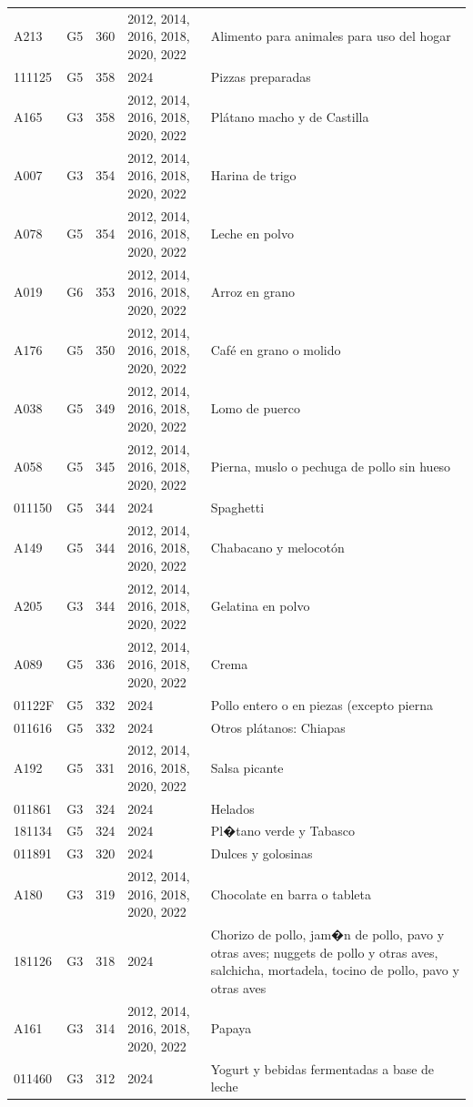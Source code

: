 \begin{table}[ht]
\begin{tabular}{llrll}
  A213 & G5 & 360 & 2012, 2014, 2016, 2018, 2020, 2022 & Alimento para animales para uso del hogar \\ 
  111125 & G5 & 358 & 2024 & Pizzas preparadas \\ 
  A165 & G3 & 358 & 2012, 2014, 2016, 2018, 2020, 2022 & Plátano macho y de Castilla \\ 
  A007 & G3 & 354 & 2012, 2014, 2016, 2018, 2020, 2022 & Harina de trigo \\ 
  A078 & G5 & 354 & 2012, 2014, 2016, 2018, 2020, 2022 & Leche en polvo \\ 
  A019 & G6 & 353 & 2012, 2014, 2016, 2018, 2020, 2022 & Arroz en grano \\ 
  A176 & G5 & 350 & 2012, 2014, 2016, 2018, 2020, 2022 & Café en grano o molido \\ 
  A038 & G5 & 349 & 2012, 2014, 2016, 2018, 2020, 2022 & Lomo de puerco \\ 
  A058 & G5 & 345 & 2012, 2014, 2016, 2018, 2020, 2022 & Pierna, muslo o pechuga de pollo sin hueso \\ 
  011150 & G5 & 344 & 2024 & Spaghetti \\ 
  A149 & G5 & 344 & 2012, 2014, 2016, 2018, 2020, 2022 & Chabacano y melocotón \\ 
  A205 & G3 & 344 & 2012, 2014, 2016, 2018, 2020, 2022 & Gelatina en polvo \\ 
  A089 & G5 & 336 & 2012, 2014, 2016, 2018, 2020, 2022 & Crema \\ 
  01122F & G5 & 332 & 2024 & Pollo entero o en piezas (excepto pierna \\ 
  011616 & G5 & 332 & 2024 & Otros plátanos: Chiapas \\ 
  A192 & G5 & 331 & 2012, 2014, 2016, 2018, 2020, 2022 & Salsa picante \\ 
  011861 & G3 & 324 & 2024 & Helados \\ 
  181134 & G5 & 324 & 2024 & Pl�tano verde y Tabasco \\ 
  011891 & G3 & 320 & 2024 & Dulces y golosinas \\ 
  A180 & G3 & 319 & 2012, 2014, 2016, 2018, 2020, 2022 & Chocolate en barra o tableta \\ 
  181126 & G3 & 318 & 2024 & Chorizo de pollo, jam�n de pollo, pavo y otras aves; nuggets de pollo y otras aves, salchicha, mortadela, tocino de pollo, pavo y otras aves \\ 
  A161 & G3 & 314 & 2012, 2014, 2016, 2018, 2020, 2022 & Papaya \\ 
  011460 & G3 & 312 & 2024 & Yogurt y bebidas fermentadas a base de leche \\ 

\end{tabular}
\end{table}
